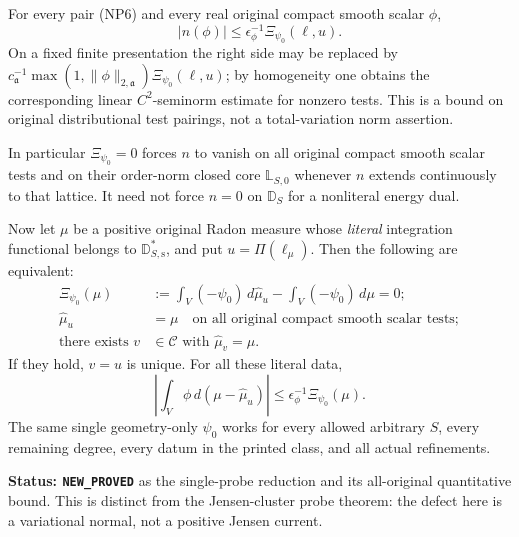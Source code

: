 \begin{theorem}
\label{thm:r12-one-probe-normal-detector}
For every pair \textup{(NP6)} and every real original
compact smooth scalar $\phi$,
\[
            |n(\phi)|
                 \le\epsilon_\phi^{-1}\Xi_{\psi_0}(\ell,u).
 \tag{NP8}
\]
On a fixed finite presentation the right side may be
replaced by
$c_{\mathfrak a}^{-1}\max(1,\|\phi\|_{2,\mathfrak a})
\Xi_{\psi_0}(\ell,u)$; by homogeneity one obtains the
corresponding linear $C^2$-seminorm estimate for nonzero
tests.  This is a bound on original distributional test
pairings, not a total-variation norm assertion.

In particular $\Xi_{\psi_0}=0$ forces $n$ to vanish on
all original compact smooth scalar tests and on their
order-norm closed core $\mathbb L_{S,0}$ whenever $n$
extends continuously to that lattice.  It need not force
$n=0$ on $\mathbb D_S$ for a nonliteral energy dual.

Now let $\mu$ be a positive original Radon measure whose
\emph{literal} integration functional belongs to
$\mathbb D_{S,\mathrm s}^*$, and put $u=\Pi(\ell_\mu)$.
Then the following are equivalent:
\[
 \begin{split}
 \Xi_{\psi_0}(\mu)
   &:=\int_V(-\psi_0)\,d\widehat\mu_u
                      -\int_V(-\psi_0)\,d\mu=0;\\
 \widehat\mu_u&=\mu
        \quad\text{on all original compact smooth scalar tests};\\
 \text{there exists }v&\in\mathscr C
                         \text{ with }\widehat\mu_v=\mu.
 \end{split}
 \tag{NP9}
\]
If they hold, $v=u$ is unique.  For all these literal data,
\[
 \left|\int_V\phi\,d(\mu-\widehat\mu_u)\right|
                        \le\epsilon_\phi^{-1}\Xi_{\psi_0}(\mu).
 \tag{NP10}
\]
The same single geometry-only $\psi_0$ works for every
allowed arbitrary $S$, every remaining degree, every
datum in the printed class, and all actual refinements.
\end{theorem}

\noindent\textbf{Status: \texttt{NEW\_PROVED}} as the
single-probe reduction and its all-original quantitative
bound.  This is distinct from the Jensen-cluster probe
theorem: the defect here is a variational normal, not
a positive Jensen current.


